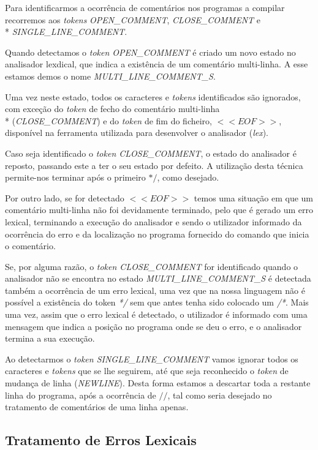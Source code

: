 \documentclass[11pt,a4paper]{article}
\begin{document}
	Para identificarmos a ocorrência de comentários nos programas a compilar recorremos aos \emph{tokens} \emph{OPEN\_COMMENT}, \emph{CLOSE\_COMMENT} e \\* \emph{SINGLE\_LINE\_COMMENT}.
	
	Quando detectamos o \emph{token OPEN\_COMMENT} é criado um novo estado no analisador lexdical, que indica a existência de um comentário multi-linha. A esse estamos demos o nome \emph{MULTI\_LINE\_COMMENT\_S}.
	
	Uma vez neste estado, todos os caracteres e \emph{tokens} identificados são ignorados, com exceção do \emph{token} de fecho do comentário multi-linha \\* (\emph{CLOSE\_COMMENT}) e do \emph{token} de fim do ficheiro, $<<EOF>>$, disponível na ferramenta utilizada para desenvolver o analisador (\emph{lex}). 
	
	Caso seja identificado o \emph{token CLOSE\_COMMENT}, o estado do analisador é reposto, passando este a ter o seu estado por defeito. A utilização desta técnica permite-nos terminar após o primeiro $*/$, como desejado.
	
	Por outro lado, se for detectado $<<EOF>>$ temos uma situação em que um comentário multi-linha não foi devidamente terminado, pelo que é gerado um erro lexical, terminando a execução do analisador e sendo o utilizador informado da ocorrência do erro e da localização no programa fornecido do comando que inicia o comentário.
	
	Se, por alguma razão, o \emph{token CLOSE\_COMMENT} for identificado quando o analisador não se encontra no estado \emph{MULTI\_LINE\_COMMENT\_S} é detectada também a ocorrência de um erro lexical, uma vez que na nossa linguagem não é possível a existência do token \emph{*/} sem que antes tenha sido colocado um \emph{/*}. Mais uma vez, assim que o erro lexical é detectado, o utilizador é informado com uma mensagem que indica a posição no programa onde se deu o erro, e o analisador termina a sua execução.
	
	Ao detectarmos o \emph{token SINGLE\_LINE\_COMMENT} vamos ignorar todos os caracteres e \emph{tokens} que se lhe seguirem, até que seja reconhecido o \emph{token} de mudança de linha (\emph{NEWLINE}). Desta forma estamos a descartar toda a restante linha do programa, após a ocorrência de $//$, tal como seria desejado no tratamento de comentários de uma linha apenas.
	
	\subsection{Tratamento de Erros Lexicais}
	
\end{document}
